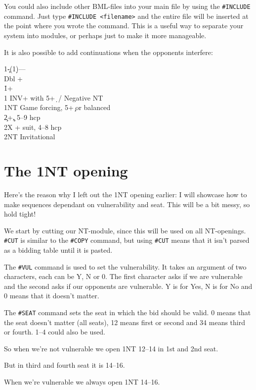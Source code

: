 \documentclass[a4paper]{article}
\begin{document}
You could also include other BML-files into your main file by using
the \texttt{\#INCLUDE} command. Just type \texttt{\#INCLUDE <filename>} and the entire
file will be inserted at the point where you wrote the command. This
is a useful way to separate your system into modules, or perhaps
just to make it more manageable.

It is also possible to add continuations when the opponents
interfere:

\begin{bidtable}
1\c-(1\d)---\\
Dbl +\h \\
1\h {}+\s \\
1\s \> INV+ with 5+\d\ / Negative NT\\
1NT \> Game forcing, 5+\c\ or balanced\\
2\c {}+\c , 5--9 hcp\\
2X + suit, 4--8 hcp\\
2NT \> Invitational
\end{bidtable}

\section{The 1NT opening}

Here's the reason why I left out the 1NT opening earlier: I will
showcase how to make sequences dependant on vulnerability and
seat. This will be a bit messy, so hold tight!

We start by cutting our NT-module, since this will be used on all
NT-openings. \texttt{\#CUT} is similar to the \texttt{\#COPY} command, but using \texttt{\#CUT}
means that it isn't parsed as a bidding table until it is pasted.

The \texttt{\#VUL} command is used to set the vulnerability. It takes an
argument of two characters, each can be Y, N or 0. The first
character asks if we are vulnerable and the second asks if our
opponents are vulnerable. Y is for Yes, N is for No and 0 means that
it doesn't matter.

The \texttt{\#SEAT} command sets the seat in which the bid should be valid. 0
means that the seat doesn't matter (all seats), 12 means first or
second and 34 means third or fourth. 1--4 could also be used.

So when we're not vulnerable we open 1NT 12--14 in 1st and 2nd seat.

But in third and fourth seat it is 14--16.

When we're vulnerable we always open 1NT 14--16.
\end{document}
